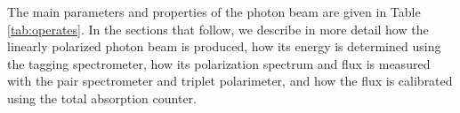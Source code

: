 The main parameters and properties of the photon beam are given in Table\,\ref{tab:operates}.
In the sections that follow, we describe in more detail how the linearly polarized photon beam
is produced, how its energy is determined using the tagging spectrometer, how its polarization
spectrum and flux is measured with the pair spectrometer and triplet polarimeter, and how the 
flux is calibrated using the total absorption counter.

\begin{table}[btp]
\begin{center}
\caption[Typical operating parameters for the \GX{} photon beam]{\label{tab:operates}
Typical operating parameters for the \GX{} photon beam,
consistent with the electron beam properties listed in Table \ref{tab:elecprop},
a diamond radiator of thickness 50~$\mu$m, and the standard primary collimator of diameter 5.0~mm
located at its nominal position. The electron beam current is taken to  be $150$~nA.
The hadronic rates are calculated for the \GX{} 30~cm liquid hydrogen target.}


\end{center}
\end{table}
